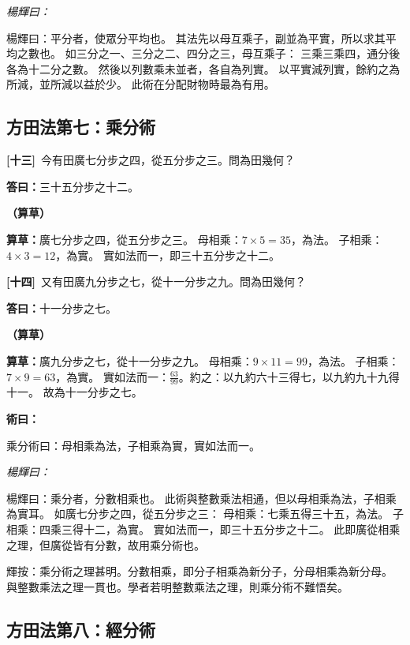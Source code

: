 \documentclass[11pt,a4paper]{article}
\newenvironment{method}{%
  \par\noindent\textcolor{methodcolor}{\textbf{術曰：}}%
  \ignorespaces
}{\par\vspace{0.5em}}
\newenvironment{caocao}{%
  \par\noindent\textcolor{caocaocolor}{\small\textbf{（算草）}}%
  \ignorespaces
}{\par\vspace{0.5em}}
\newenvironment{yanghuicomment}{%
  \par\noindent\textcolor{commentarycolor}{\small\textit{楊輝曰：}}%
  \ignorespaces
}{\par\vspace{0.5em}}
\newcommand{\problemnum}[1]{\textbf{[\ignorespaces#1\unskip]}}
\begin{document}
\begin{yanghuicomment}
楊輝曰：平分者，使眾分平均也。
其法先以母互乘子，副並為平實，所以求其平均之數也。
如三分之一、三分之二、四分之三，母互乘子：
三乘三乘四，通分後各為十二分之數。
然後以列數乘未並者，各自為列實。
以平實減列實，餘約之為所減，並所減以益於少。
此術在分配財物時最為有用。
\end{yanghuicomment}

\subsection{方田法第七：乘分術}

\noindent\problemnum{十三}\,
今有田廣七分步之四，從五分步之三。問為田幾何？

\noindent\textcolor{answercolor}{\textbf{答曰：}}三十五分步之十二。

\begin{caocao}
\textbf{算草：}廣七分步之四，從五分步之三。
母相乘：$7 \times 5 = 35$，為法。
子相乘：$4 \times 3 = 12$，為實。
實如法而一，即三十五分步之十二。
\end{caocao}

\noindent\problemnum{十四}\,
又有田廣九分步之七，從十一分步之九。問為田幾何？

\noindent\textcolor{answercolor}{\textbf{答曰：}}十一分步之七。

\begin{caocao}
\textbf{算草：}廣九分步之七，從十一分步之九。
母相乘：$9 \times 11 = 99$，為法。
子相乘：$7 \times 9 = 63$，為實。
實如法而一：$\frac{63}{99}$。約之：以九約六十三得七，以九約九十九得十一。
故為十一分步之七。
\end{caocao}

\begin{method}
乘分術曰：母相乘為法，子相乘為實，實如法而一。
\end{method}

\begin{yanghuicomment}
楊輝曰：乘分者，分數相乘也。
此術與整數乘法相通，但以母相乘為法，子相乘為實耳。
如廣七分步之四，從五分步之三：
母相乘：七乘五得三十五，為法。
子相乘：四乘三得十二，為實。
實如法而一，即三十五分步之十二。
此即廣從相乘之理，但廣從皆有分數，故用乘分術也。

輝按：乘分術之理甚明。分數相乘，即分子相乘為新分子，分母相乘為新分母。
與整數乘法之理一貫也。學者若明整數乘法之理，則乘分術不難悟矣。
\end{yanghuicomment}

\subsection{方田法第八：經分術}
\end{document}

